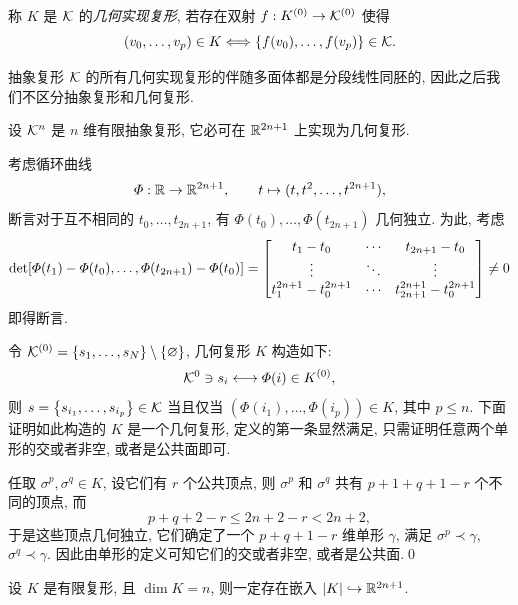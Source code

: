	\begin{Definition}[几何实现复形]
        称 $ K $ 是 $ \mathcal{K} $ 的\emph{几何实现复形}, 若存在双射 $ f : K^{(0)}\to\mathcal{K}^{(0)} $ 使得
        \[
            (v_0,\dots,v_p)\in K\Longleftrightarrow \left\{ f(v_0),\dots,f(v_p) \right\}\in\mathcal{K}.
        \]
    \end{Definition}

    抽象复形 $ \mathcal{K} $ 的所有几何实现复形的伴随多面体都是分段线性同胚的, 因此之后我们不区分抽象复形和几何复形.

    \begin{Theorem}
        设 $ \mathcal{K}^n $ 是 $ n $ 维有限抽象复形, 它必可在 $ \mathbb{R}^{2n+1} $ 上实现为几何复形.
    \end{Theorem}
    \begin{Proof}
        考虑循环曲线
        \[
            \varPhi : \mathbb{R}\to\mathbb{R}^{2n+1},\qquad t\mapsto (t,t^2,\dots,t^{2n+1}),
        \]
        断言对于互不相同的 $ t_0,\dots,t_{2n+1} $, 有 $ \varPhi(t_0),\dots,\varPhi(t_{2n+1}) $ 几何独立. 为此, 考虑
        \[
            \det[\varPhi(t_1)-\varPhi(t_0),\dots,\varPhi(t_{2n+1})-\varPhi(t_0)]=\mqty[t_1-t_0 & \cdots & t_{2n+1}-t_0 \\ \vdots & \ddots & \vdots \\ t_1^{2n+1}-t_0^{2n+1} & \cdots & t_{2n+1}^{2n+1}-t_0^{2n+1}]\ne 0
        \]
        即得断言.

        令 $ \mathcal{K}^{(0)}=\left\{ s_1,\dots,s_N \right\}\setminus\left\{ \varnothing \right\} $, 几何复形 $ K $ 构造如下:
        \[
            \mathcal{K}^{0}\ni s_i\longleftrightarrow\varPhi(i)\in K^{(0)},
        \] 
        则 $ s=\left\{ s_{i_1},\dots,s_{i_p} \right\}\in\mathcal{K} $ 当且仅当 $ (\varPhi(i_1),\dots,\varPhi(i_p))\in K $, 其中 $ p\leqslant n $. 下面证明如此构造的 $ K $ 是一个几何复形, 定义的第一条显然满足, 只需证明任意两个单形的交或者非空, 或者是公共面即可.

        任取 $ \sigma^p,\sigma^q\in K $, 设它们有 $ r $ 个公共顶点, 则 $ \sigma^p $ 和 $ \sigma^q $ 共有 $ p+1+q+1-r $ 个不同的顶点, 而
        \[
            p+q+2-r\leqslant 2n+2-r<2n+2,
        \]
        于是这些顶点几何独立, 它们确定了一个 $ p+q+1-r $ 维单形 $ \gamma $, 满足 $ \sigma^p\prec\gamma $, $ \sigma^q\prec\gamma $. 因此由单形的定义可知它们的交或者非空, 或者是公共面.\qed
    \end{Proof}

    \begin{Corollary}
        设 $ K $ 是有限复形, 且 $ \dim K=n $, 则一定存在嵌入 $ \left| K \right| \hookrightarrow\mathbb{R}^{2n+1} $.
    \end{Corollary}

